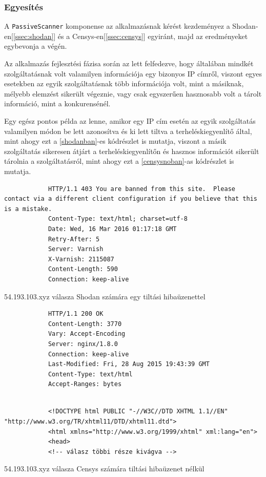 \documentclass[a4paper,12pt]{article}
\begin{document}
\subsubsection{Egyesítés}

	A \texttt{PassiveScanner} komponense az alkalmazásnak kérést kezdeményez a Shodan-en[\ref{ssec:shodan}] és a  Censys-en[\ref{ssec:censys}] egyiránt, majd az eredményeket egybevonja a végén.
	
	Az alkalmazás fejlesztési fázisa során az lett felfedezve, hogy általában mindkét szolgáltatásnak volt valamilyen információja egy bizonyos IP címről, viszont egyes esetekben az egyik szolgáltatásnak több információja volt, mint a másiknak, mélyebb elemzést sikerült végeznie, vagy csak egyszerűen hasznosabb volt a tárolt információ, mint a konkurensénél.
	
	Egy egész pontos példa az lenne, amikor egy IP cím esetén az egyik szolgáltatás valamilyen módon be lett azonosítva és ki lett tiltva a terheléskiegyenlítő által, mint ahogy ezt a \ref{shodanban}-es kódrészlet is mutatja, viszont a másik szolgáltatás sikeresen átjárt a terheléskiegyenlítőn és hasznos információt sikerült tárolnia a szolgáltatásról, mint ahogy ezt a \ref{censysnoban}-as kódrészlet is mutatja.
	
	\begin{listing}[H]
		\begin{verbatim}
			HTTP/1.1 403 You are banned from this site.  Please contact via a different client configuration if you believe that this is a mistake.
			Content-Type: text/html; charset=utf-8
			Date: Wed, 16 Mar 2016 01:17:18 GMT
			Retry-After: 5
			Server: Varnish
			X-Varnish: 2115087
			Content-Length: 590
			Connection: keep-alive
		\end{verbatim}
		\caption{54.193.103.xyz válasza Shodan számára egy tiltási hibaüzenettel}
		\label{shodanban}
	\end{listing}
		
	\begin{listing}[H]
		\begin{verbatim}
			HTTP/1.1 200 OK
			Content-Length: 3770
			Vary: Accept-Encoding
			Server: nginx/1.8.0
			Connection: keep-alive
			Last-Modified: Fri, 28 Aug 2015 19:43:39 GMT
			Content-Type: text/html
			Accept-Ranges: bytes
		\end{verbatim}
		\vspace{-5pt}
		\begin{verbatim}
			 
			<!DOCTYPE html PUBLIC "-//W3C//DTD XHTML 1.1//EN" "http://www.w3.org/TR/xhtml11/DTD/xhtml11.dtd">
			<html xmlns="http://www.w3.org/1999/xhtml" xml:lang="en">
			<head>
			<!-- válasz többi része kivágva -->
		\end{verbatim}
		\caption{54.193.103.xyz válasza Censys számára tiltási hibaüzenet nélkül}
		\label{censysnoban}
	\end{listing}
	
\end{document}
